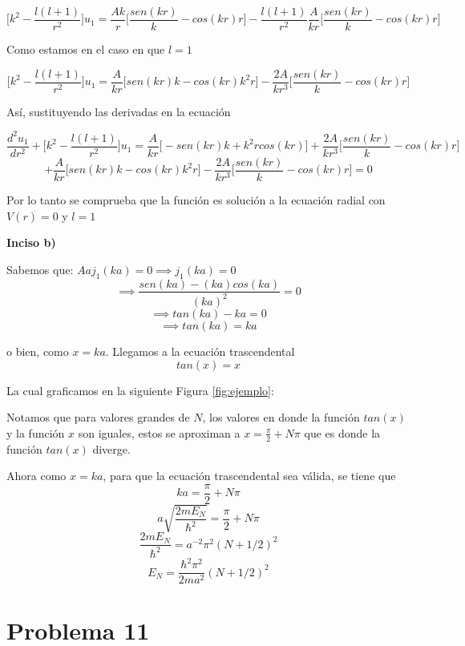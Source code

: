 \documentclass[10pt]{article}
\begin{document}
$$\bigg[k^{2}-\frac{l(l+1)}{r^{2}} \bigg]u_{1}=\frac{Ak}{r}\bigg[ \frac{sen(kr)}{k}-cos(kr)r \bigg] -\frac{l(l+1)}{r^{2}} \frac{A}{kr}\bigg[ \frac{sen(kr)}{k}-cos(kr)r \bigg]$$



Como estamos en el caso en que $l=1$

$$\bigg[k^{2}-\frac{l(l+1)}{r^{2}} \bigg]u_{1}=\frac{A}{kr}\bigg[ sen(kr)k-cos(kr)k^{2}r \bigg] -\frac{2A}{kr^{3}}\bigg[ \frac{sen(kr)}{k}-cos(kr)r \bigg]$$

Así, sustituyendo las derivadas en la ecuación

$$\frac{d^{2}u_{1}}{dr^{2}}+\bigg[ k^{2}-\frac{l(l+1)}{r^{2}} \bigg]u_{1}=\frac{A}{kr}\bigg[-sen(kr)k+k^{2}rcos(kr)\bigg]+ \frac{2A}{kr^{3}}\bigg[ \frac{sen(kr)}{k}-cos(kr)r\bigg]$$
$$+\frac{A}{kr}\bigg[ sen(kr)k-cos(kr)k^{2}r \bigg] -\frac{2A}{kr^{3}}\bigg[ \frac{sen(kr)}{k}-cos(kr)r \bigg]=0$$

Por lo tanto se comprueba que la función es solución a la ecuación radial con $V(r)=0$ y $l=1$


\textbf{Inciso b)}

Sabemos que: $Aaj_{1}(ka)=0 \implies j_{1}(ka)=0$
$$\implies \frac{sen(ka)-(ka)cos(ka)}{(ka)^{2}}=0$$
$$\implies tan(ka)-ka=0$$
$$\implies tan(ka)=ka$$

o bien, como $x=ka$. Llegamos a la ecuación trascendental 
$$tan(x)=x$$

La cual graficamos en la siguiente Figura \ref{fig:ejemplo}: 


Notamos que para valores grandes de $N$, los valores en donde la función $tan(x)$ y la función $x$ son iguales, estos se aproximan a $x= \frac{\pi}{2}+N\pi$ que es donde la función $tan(x)$ diverge.  


Ahora como $x=ka$, para que la ecuación trascendental sea válida, se tiene que $$ka=\frac{\pi}{2}+N\pi$$
$$a\sqrt{\frac{2mE_{N}}{\hbar^{2}}}=\frac{\pi}{2}+N\pi$$
$$\frac{2mE_{N}}{\hbar^{2}}=a^{-2}\pi^{2}(N+1/2)^{2}$$
$$E_{N}=\frac{\hbar^{2}\pi^{2}}{2ma^{2}}(N +1/2)^{2}$$


\medskip

\section{Problema 11}
\end{document}
